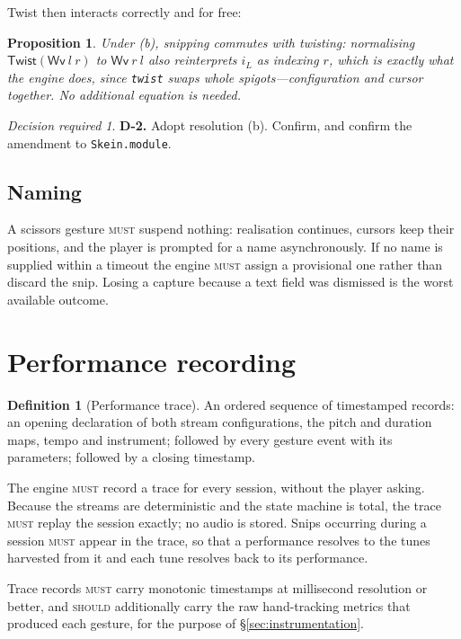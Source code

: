 \documentclass[11pt,a4paper]{article}
\newcommand{\MUST}{\textsc{must}}
\newcommand{\SHOULD}{\textsc{should}}
\theoremstyle{definition}
\newtheorem{definition}{Definition}
\theoremstyle{plain}
\newtheorem{proposition}{Proposition}
\theoremstyle{remark}
\newtheorem*{decision}{Decision required}
\begin{document}
Twist then interacts correctly and for free:

\begin{proposition}
Under (b), snipping commutes with twisting: normalising $\textsf{Twist}(\textsf{Wv}\ l\ r)$ to
$\textsf{Wv}\ r\ l$ also reinterprets $i_L$ as indexing $r$, which is exactly what the engine does,
since \texttt{twist} swaps whole spigots---configuration and cursor together. No additional
equation is needed.
\end{proposition}

\begin{decision}
\textbf{D-2.} Adopt resolution (b). Confirm, and confirm the amendment to \texttt{Skein.module}.
\end{decision}

\subsection{Naming}

A scissors gesture \MUST{} suspend nothing: realisation continues, cursors keep their positions, and
the player is prompted for a name asynchronously. If no name is supplied within a timeout the
engine \MUST{} assign a provisional one rather than discard the snip. Losing a capture because a
text field was dismissed is the worst available outcome.

\section{Performance recording}

\begin{definition}[Performance trace]
An ordered sequence of timestamped records: an opening declaration of both stream configurations,
the pitch and duration maps, tempo and instrument; followed by every gesture event with its
parameters; followed by a closing timestamp.
\end{definition}

The engine \MUST{} record a trace for every session, without the player asking. Because the streams
are deterministic and the state machine is total, the trace \MUST{} replay the session exactly; no
audio is stored. Snips occurring during a session \MUST{} appear in the trace, so that a performance
resolves to the tunes harvested from it and each tune resolves back to its performance.

Trace records \MUST{} carry monotonic timestamps at millisecond resolution or better, and \SHOULD{}
additionally carry the raw hand-tracking metrics that produced each gesture, for the purpose of
\S\ref{sec:instrumentation}.
\end{document}
